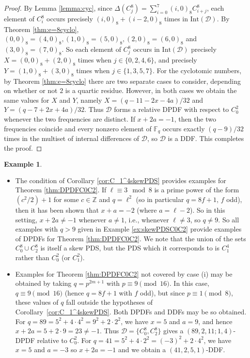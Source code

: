 \documentclass[12pt, a4paper]{article}
\theoremstyle{definition}
\newtheorem{example}[theorem]{Example}
\begin{document}
\begin{proof}
By Lemma \ref{lemma:cyc}, since $\Delta(C_j^8)=\sum_{i=0}^7 (i,0)_8 C_{i+j}^8$, each element of $C_i^{8}$ occurs precisely $(i,0)_8+(i-2,0)_8$ times in $\mathrm{Int}(\mathcal D)$. 
By Theorem \ref{thm:e=8cyclo}, $(0,0)_8=(4,0)_8, (1,0)_8=(5,0)_8, (2,0)_8=(6,0)_8$ and $(3,0)_8=(7,0)_8$.  So each element of $C_j^8$ occurs in $\mathrm{Int}(\mathcal{D})$ precisely $X=(0,0)_8+(2,0)_8$ times when $j \in \{0,2,4,6\}$, and precisely $Y=(1,0)_8+(3,0)_8$ times when $j \in \{1,3,5,7\}$.  For the cyclotomic numbers, by Theorem \ref{thm:e=8cyclo} there are two separate cases to consider, depending on whether or not $2$ is a quartic residue.  However, in both cases we obtain the same values for $X$ and $Y$, namely $X=(q-11-2x-4a)/32$ and $Y=(q-7+2x+4a)/32$. Thus $\mathcal D$ forms a relative DPDF with respect to $C_0^2$ whenever the two frequencies are distinct.
		If $x+2a=-1$, then the two frequencies coincide and every nonzero element of $\mathbb F_q$ occurs exactly
	${(q-9)}/{32}
	$ 
	times in the multiset of internal differences of $\mathcal D$, so $\mathcal D$ is a DDF. This completes the proof. 
\end{proof}


\begin{example}\label{ex:C0C2}
\begin{itemize}
\item[(i)] The condition of Corollary \ref {cor:C_1^4skewPDS} provides examples for Theorem \ref{thm:DPDFC0C2}.  If $\ell \equiv 3 \mod 8$ is a prime power of the form $(c^2/2)+1$ for some $c \in \mathbb{Z}$ and $q=\ell^2$ (so in particular $q=8f+1$, $f$ odd), then it has been shown that $x+a=-2$ (where $a=\ell-2$).  So in this setting, $x+2a \neq -1$ whenever $a \neq 1$, i.e.,  whenever $\ell \neq 3$, so $q \neq 9$. So all examples with $q>9$ given in Example \ref{ex:skewPDSC0C2} provide examples of DPDFs for Theorem \ref{thm:DPDFC0C2}.  We note that the union of the sets $C_0^8 \cup C_2^8$ is itself a skew PDS, but the PDS which it corresponds to is $C_1^4$ rather than $C_0^2$ (or $C_1^2$).
\item[(ii)] Examples for Theorem \ref{thm:DPDFC0C2} not covered by case (i) may be obtained by taking $q=p^{2m+1}$ with $p \equiv 9 \pmod{16}$. In this case, $q \equiv 9 \pmod{16}$ (hence $q=8f+1$ with $f$ odd), but since $p \equiv 1 \pmod{8}$, these values of $q$ fall outside the hypotheses of Corollary~\ref{cor:C_1^4skewPDS}. Both DPDFs and DDFs may be so obtained. For $q=89 = 5^2 + 4\cdot 4^2 = 9^2 + 2\cdot 2^2$, we have $x=5$ and $a=9$, and hence $x+2a=5+2\cdot 9=23 \neq -1$. Thus $\mathcal D=\{C_0^8,C_2^8\}$ gives a $(89,2,11;1,4)$-DPDF relative to $C_0^2$.  For $q=41=5^2+4 \cdot 2^2=(-3)^2+2 \cdot 4^2$, we have $x=5$ and $a=-3$ so $x+2a=-1$ and we obtain a $(41,2,5,1)$-DDF.
\end{itemize}
\end{example}
\end{document}
